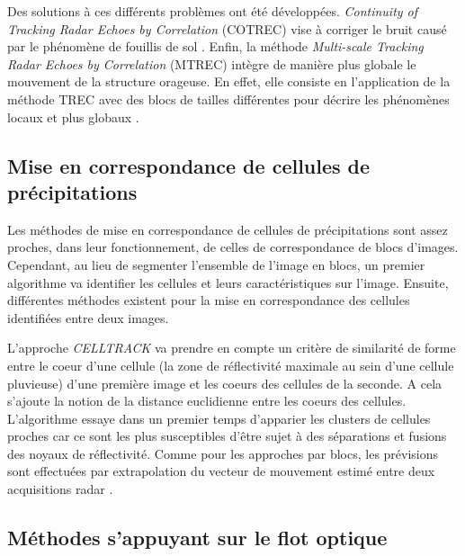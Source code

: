 \documentclass[12pt,a4paper,french]{article}
\newcommand\subsecspacing{1cm}
\begin{document}
Des solutions à ces différents problèmes ont été développées. \textit{Continuity of Tracking Radar Echoes by Correlation} (COTREC) vise à corriger le bruit causé par le phénomène de fouillis de sol \cite{1995JApMe..34.1286L}. Enfin, la méthode \textit{Multi-scale Tracking Radar Echoes by Correlation} (MTREC) intègre de manière plus globale le mouvement de la structure orageuse. En effet, elle consiste en l'application de la méthode TREC avec des blocs de tailles différentes pour décrire les phénomènes locaux et plus globaux \cite{120026}. \newline


\vspace{\subsecspacing}

\subsection{Mise en correspondance de cellules de précipitations}

Les méthodes de mise en correspondance de cellules de précipitations sont assez proches, dans leur fonctionnement, de celles de correspondance de blocs d'images. Cependant, au lieu de segmenter l'ensemble de l'image en blocs, un premier algorithme va identifier les cellules et leurs caractéristiques sur l'image. Ensuite, différentes méthodes existent pour la mise en correspondance des cellules identifiées entre deux images. \newline

L'approche \textit{CELLTRACK} va prendre en compte un critère de similarité de forme entre le coeur d'une cellule (la zone de réflectivité maximale au sein d'une cellule pluvieuse) d'une première image et les coeurs des cellules de la seconde. A cela s'ajoute la notion de la distance euclidienne entre les coeurs des cellules. L'algorithme essaye dans un premier temps d'apparier les clusters de cellules proches car ce sont les plus susceptibles d'être sujet à des séparations et fusions des noyaux de réflectivité. Comme pour les approches par blocs, les prévisions sont effectuées par extrapolation du vecteur de mouvement estimé entre deux acquisitions radar \cite{celltrack}. 

\vspace{\subsecspacing}

\subsection{Méthodes s'appuyant sur le flot optique}
\end{document}
